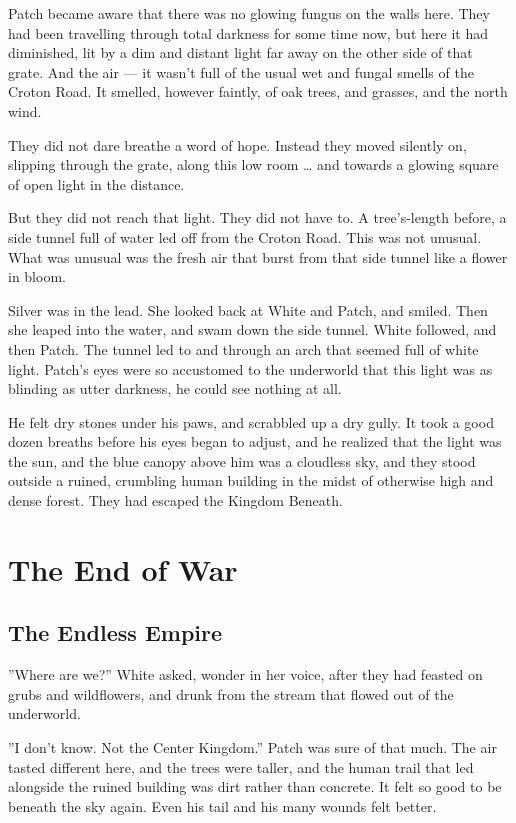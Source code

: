 \documentclass[12pt]{book}
\begin{document}
Patch became aware that there was no glowing fungus on the walls
here. They had been travelling through total darkness for some time
now, but here it had diminished, lit by a dim and distant light far
away on the other side of that grate. And the air --- it wasn't full
of the usual wet and fungal smells of the Croton Road. It smelled,
however faintly, of oak trees, and grasses, and the north wind.

They did not dare breathe a word of hope. Instead they moved silently
on, slipping through the grate, along this low room \ldots{} and
towards a glowing square of open light in the distance.

But they did not reach that light. They did not have to. A
tree's-length before, a side tunnel full of water led off from the
Croton Road. This was not unusual. What was unusual was the fresh air
that burst from that side tunnel like a flower in bloom.

Silver was in the lead. She looked back at White and Patch, and
smiled. Then she leaped into the water, and swam down the side
tunnel. White followed, and then Patch. The tunnel led to and through
an arch that seemed full of white light. Patch's eyes were so
accustomed to the underworld that this light was as blinding as utter
darkness, he could see nothing at all.

He felt dry stones under his paws, and scrabbled up a dry gully. It
took a good dozen breaths before his eyes began to adjust, and he
realized that the light was the sun, and the blue canopy above him was
a cloudless sky, and they stood outside a ruined, crumbling human
building in the midst of otherwise high and dense forest. They had
escaped the Kingdom Beneath.


\chapter{The End of War}

\section{The Endless Empire}

''Where are we?'' White asked, wonder in her voice, after they had
feasted on grubs and wildflowers, and drunk from the stream that
flowed out of the underworld.

''I don't know. Not the Center Kingdom.'' Patch was sure of that
much. The air tasted different here, and the trees were taller, and
the human trail that led alongside the ruined building was dirt rather
than concrete. It felt so good to be beneath the sky again. Even his
tail and his many wounds felt better.
\end{document}
